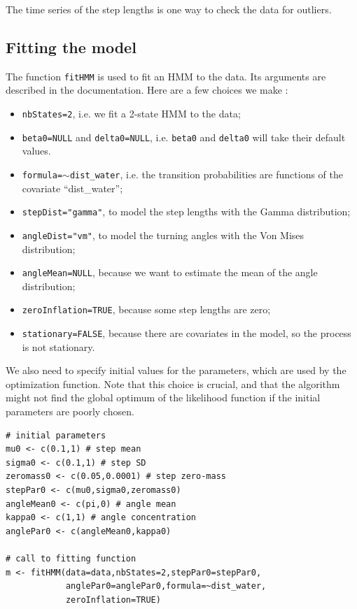 \documentclass[]{article}
\begin{document}
The time series of the step lengths is one way to check the data for outliers.

\subsection{Fitting the model}
The function \texttt{fitHMM} is used to fit an HMM to the data. Its arguments are described in the documentation. Here are a few choices we make :
\begin{itemize}
	\item \texttt{nbStates=2}, i.e. we fit a 2-state HMM to the data;
	\item \texttt{beta0=NULL} and \texttt{delta0=NULL}, i.e. \texttt{beta0} and \texttt{delta0} will take their default values.
	\item \texttt{formula=$\sim$dist\_water}, i.e. the transition probabilities are functions of the covariate ``dist\_water'';
	\item \texttt{stepDist="gamma"}, to model the step lengths with the Gamma distribution;
	\item \texttt{angleDist="vm"}, to model the turning angles with the Von Mises distribution;
	\item \texttt{angleMean=NULL}, because we want to estimate the mean of the angle distribution;
	\item \texttt{zeroInflation=TRUE}, because some step lengths are zero;
	\item \texttt{stationary=FALSE}, because there are covariates in the model, so the process is not stationary. 
\end{itemize}

We also need to specify initial values for the parameters, which are used by the optimization function. Note that this choice is crucial, and that the algorithm might not find the global optimum of the likelihood function if the initial parameters are poorly chosen.

\begin{lstlisting}
# initial parameters
mu0 <- c(0.1,1) # step mean
sigma0 <- c(0.1,1) # step SD
zeromass0 <- c(0.05,0.0001) # step zero-mass
stepPar0 <- c(mu0,sigma0,zeromass0)
angleMean0 <- c(pi,0) # angle mean
kappa0 <- c(1,1) # angle concentration
anglePar0 <- c(angleMean0,kappa0)

# call to fitting function
m <- fitHMM(data=data,nbStates=2,stepPar0=stepPar0,
			anglePar0=anglePar0,formula=~dist_water,
			zeroInflation=TRUE)
\end{lstlisting}
\end{document}
